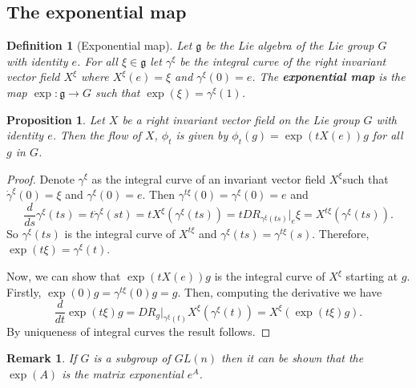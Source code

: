 \documentclass[a4paper]{article}
\newtheorem{definition}{Definition}[section]
\newtheorem{proposition}[theorem]{Proposition}
\newtheorem*{remark}{Remark}
\begin{document}

\subsection{The exponential map}

\begin{definition}[Exponential map]
Let $\mathfrak{g}$ be the Lie algebra of the Lie group $G$ with identity $e$. For all $\xi \in \mathfrak{g}$ let $\gamma^{\xi}$ be the integral curve of the right invariant vector field $X^{\xi}$ where $X^\xi (e)=\xi$ and $\gamma^\xi(0) = e$. The \textbf{exponential map} is the map $\exp : \mathfrak{g} \rightarrow G$ such that $\exp(\xi) = \gamma^\xi(1)$. 
\end{definition}
\begin{proposition}
  Let $X$ be a right invariant vector field on the Lie group $G$ with identity $e$. Then the flow of $X$, $\phi_t$ is given by $\phi_t(g) = \exp(tX(e))g$ for all $g$ in $G$.
\end{proposition}
\begin{proof}
  Denote $\gamma^{\xi}$ as the integral curve of an  invariant vector field $X^{\xi}$such that $\dot{\gamma}^{\xi}(0) = \xi$ and $\gamma^\xi(0)=e$. Then $\gamma^{t\xi}(0) =  \gamma^{\xi}(0)=e$ and 
  \begin{equation}
    \frac{d}{ds}\gamma^{\xi}(ts) = t\dot\gamma^{\xi}(st)=tX^\xi(\gamma^{\xi}(ts)) = t D R_{\gamma^\xi(ts)} \vert_{e} \xi = X^{t\xi}(\gamma^{\xi}(ts)).
  \end{equation}
  So $\gamma^\xi(ts)$ is the integral curve of $X^{t\xi}$ and $\gamma^\xi(ts)=\gamma^{t\xi}(s)$. Therefore,  $\exp(t\xi) = \gamma^{\xi}(t)$.
  
  Now, we can show that $\exp(tX(e))g$ is the integral curve of $X^{\xi}$ starting at $g$. Firstly, $\exp(0)g = \gamma^{t\xi}(0)g=g$. Then, computing the derivative we have 
  \begin{equation}
    \frac{d}{dt} \exp(t\xi)g = D R_g \vert_{\gamma^\xi(t)} X^\xi(\gamma^\xi(t)) = X^\xi(\exp(t\xi)g).
  \end{equation}
  By uniqueness of integral curves the result follows. 
\end{proof}
\begin{remark}
  If $G$ is a subgroup of $GL(n)$ then it can be shown that the $\exp(A)$ is the matrix exponential $e^{A}$.
\end{remark}
\cite{lystad2019}
\end{document}
